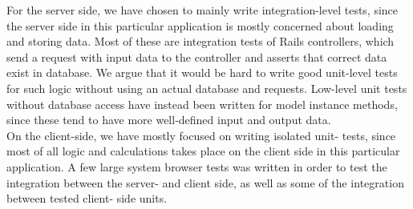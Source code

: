 
For the server side, we have chosen to mainly write integration-level
tests, since the server side in this particular application is mostly
concerned about loading and storing data. Most of these are integration
tests of Rails controllers, which send a request with input data to the
controller and asserts that correct data exist in database. We argue
that it would be hard to write good unit-level tests for such logic
without using an actual database and requests. Low-level unit tests
without database access have instead been written for model instance
methods, since these tend to have more well-defined input and output
data.\\

On the client-side, we have mostly focused on writing isolated unit-
tests, since most of all logic and calculations takes place on the
client side in this particular application. A few large system
browser tests was written in order to test the integration between the
server- and client side, as well as some of the integration between
tested client- side units.\\
